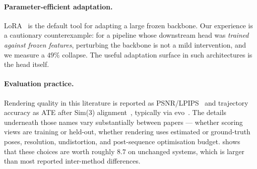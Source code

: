 \paragraph{Parameter-efficient adaptation.}
LoRA~\cite{hu2022lora} is the default tool for adapting a large frozen
backbone. Our experience is a cautionary counterexample: for a pipeline whose
downstream head was \emph{trained against frozen features}, perturbing the
backbone is not a mild intervention, and we measure a $49\%$ collapse. The
useful adaptation surface in such architectures is the head itself.

\paragraph{Evaluation practice.}
Rendering quality in this literature is reported as PSNR/LPIPS~\cite{zhang2018lpips}
and trajectory accuracy as ATE after Sim(3) alignment~\cite{umeyama1991},
typically via evo~\cite{grupp2017evo}. The details underneath those names vary
substantially between papers --- whether scoring views are training or held-out,
whether rendering uses estimated or ground-truth poses, resolution,
undistortion, and post-sequence optimisation budget.  shows
that these choices are worth roughly $8.7$\dB{} on unchanged systems, which is
larger than most reported inter-method differences.
